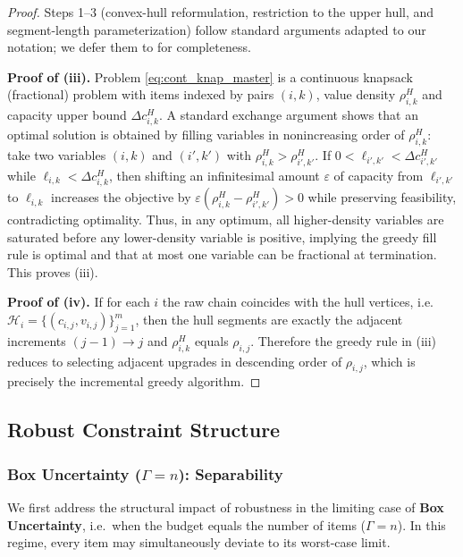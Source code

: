 \documentclass[11pt, a4paper]{article}
\theoremstyle{plain}
\theoremstyle{definition}
\theoremstyle{remark}
\begin{document}
\begin{proof}
Steps 1--3 (convex-hull reformulation, restriction to the upper hull, and segment-length parameterization) follow standard arguments adapted to our notation; we defer them to  for completeness.

\textbf{Proof of (iii).}
Problem \eqref{eq:cont_knap_master} is a continuous knapsack (fractional) problem with items indexed by pairs $(i,k)$,
value density $\rho^H_{i,k}$ and capacity upper bound $\Delta c^H_{i,k}$.
A standard exchange argument shows that an optimal solution is obtained by filling variables in nonincreasing order of $\rho^H_{i,k}$:
take two variables $(i,k)$ and $(i',k')$ with $\rho^H_{i,k}>\rho^H_{i',k'}$. If $0<\ell_{i',k'}<\Delta c^H_{i',k'}$ while
$\ell_{i,k}<\Delta c^H_{i,k}$, then shifting an infinitesimal amount $\varepsilon$ of capacity from $\ell_{i',k'}$ to $\ell_{i,k}$
increases the objective by $\varepsilon(\rho^H_{i,k}-\rho^H_{i',k'})>0$ while preserving feasibility, contradicting optimality.
Thus, in any optimum, all higher-density variables are saturated before any lower-density variable is positive, implying the greedy fill rule
is optimal and that at most one variable can be fractional at termination. This proves (iii).

\textbf{Proof of (iv).}
If for each $i$ the raw chain coincides with the hull vertices, i.e.\
$\mathcal H_i=\{(c_{i,j},v_{i,j})\}_{j=1}^m$,
then the hull segments are exactly the adjacent increments $(j-1)\to j$ and $\rho^H_{i,k}$ equals $\rho_{i,j}$.
Therefore the greedy rule in (iii) reduces to selecting adjacent upgrades in descending order of $\rho_{i,j}$, which is precisely the
incremental greedy algorithm. \qedhere
\end{proof}

\subsection{Robust Constraint Structure}
\subsubsection{Box Uncertainty (\texorpdfstring{$\Gamma=n$}{Gamma=n}): Separability}
We first address the structural impact of robustness in the limiting case of \textbf{Box Uncertainty}, i.e.\ when the budget equals the number of items ($\Gamma=n$). In this regime, every item may simultaneously deviate to its worst-case limit.
\end{document}
